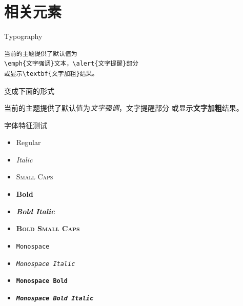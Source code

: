 \documentclass{kw-cn}
\begin{document}
\section{相关元素}

\begin{frame}[fragile]{Typography}
\begin{verbatim}当前的主题提供了默认值为
\emph{文字强调}文本，\alert{文字提醒}部分
或显示\textbf{文字加粗}结果。\end{verbatim}
	
\begin{center}变成下面的形式\end{center}
	
当前的主题提供了默认值为\emph{文字强调}，\alert{文字提醒}部分
或显示\textbf{文字加粗}结果。

\end{frame}



\begin{frame}{字体特征测试}
	\begin{itemize}
		\item Regular
		\item \textit{Italic}
		\item \textsc{Small Caps}
		\item \textbf{Bold}
		\item \textbf{\textit{Bold Italic}}
		\item \textbf{\textsc{Bold Small Caps}}
		\item \texttt{Monospace}
		\item \texttt{\textit{Monospace Italic}}
		\item \texttt{\textbf{Monospace Bold}}
		\item \texttt{\textbf{\textit{Monospace Bold Italic}}}
	\end{itemize}
\end{frame}
\end{document}

